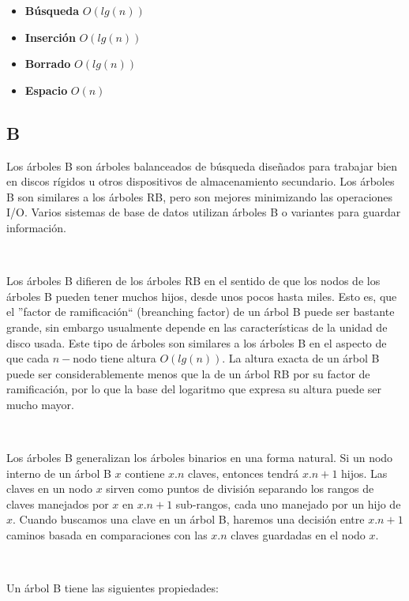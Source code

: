 \documentclass[10pt, a4paper]{report}
\begin{document}
\begin{itemize}
 \item \textbf{B\'usqueda} $O(lg(n))$
 \item \textbf{Inserci\'on} $O(lg(n))$
 \item \textbf{Borrado} $O(lg(n))$
 \item \textbf{Espacio} $O(n)$
\end{itemize}

\subsection{B}

Los \'arboles B son \'arboles balanceados de b\'usqueda dise\~nados para trabajar bien en discos r\'igidos u otros dispositivos de almacenamiento secundario. Los \'arboles B son similares a los \'arboles RB, pero son mejores minimizando las operaciones I/O. Varios sistemas de base de datos utilizan \'arboles B o variantes para guardar informaci\'on.

~

Los \'arboles B difieren de los \'arboles RB en el sentido de que los nodos de los \'arboles B pueden tener muchos hijos, desde unos pocos hasta miles. Esto es, que el ''factor de ramificaci\'on`` (breanching factor) de un \'arbol B puede ser bastante grande, sin embargo usualmente depende en las caracter\'isticas de la unidad de disco usada. Este tipo de \'arboles son similares a los \'arboles B en el aspecto de que cada $n-$nodo tiene altura $O(lg(n))$. La altura exacta de un \'arbol B puede ser considerablemente menos que la de un \'arbol RB por su factor de ramificaci\'on, por lo que la base del logaritmo que expresa su altura puede ser mucho mayor.

~

Los \'arboles B generalizan los \'arboles binarios en una forma natural. Si un nodo interno de un \'arbol B $x$ contiene $x.n$ claves, entonces tendr\'a $x.n+1$  hijos. Las claves en un nodo $x$ sirven como puntos de divisi\'on separando los rangos de claves manejados por $x$ en $x.n+1$ sub-rangos, cada uno manejado por un hijo de $x$. Cuando buscamos una clave en un \'arbol B, haremos una decisi\'on entre $x.n+1$ caminos basada en comparaciones con las $x.n$ claves guardadas en el nodo $x$.

~

Un \'arbol B tiene las siguientes propiedades:
\end{document}
